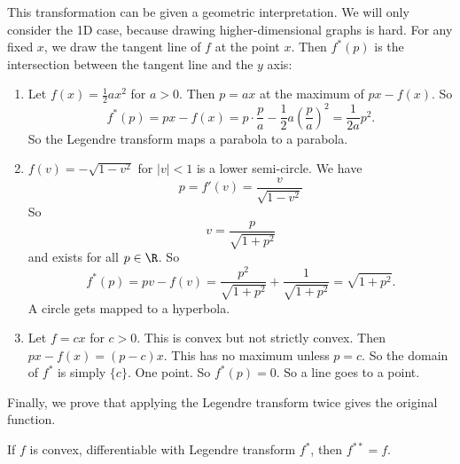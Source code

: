 \documentclass[a4paper]{article}
\begin{document}
This transformation can be given a geometric interpretation. We will only consider the 1D case, because drawing higher-dimensional graphs is hard. For any fixed $x$, we draw the tangent line of $f$ at the point $x$. Then $f^*(p)$ is the intersection between the tangent line and the $y$ axis:
\begin{center}
\end{center}

\begin{eg}\leavevmode
  \begin{enumerate}
    \item Let $f(x) = \frac{1}{2}ax^2$ for $a > 0$. Then $p = ax$ at the maximum of $px - f(x)$. So
      \[
        f^*(p) = px - f(x) = p\cdot \frac{p}{a} - \frac{1}{2}a\left(\frac{p}{a}\right)^2 = \frac{1}{2a}p^2.
      \]
      So the Legendre transform maps a parabola to a parabola.
    \item $f(v) = -\sqrt{1 - v^2}$ for $|v| < 1$ is a lower semi-circle. We have
      \[
        p = f'(v) = \frac{v}{\sqrt{1 - v^2}}
      \]
      So
      \[
        v = \frac{p}{\sqrt{1 + p^2}}
      \]
      and exists for all $p\in \R$. So
      \[
        f^*(p) = pv - f(v) = \frac{p^2}{\sqrt{1 + p^2}} + \frac{1}{\sqrt{1 + p^2}} = \sqrt{1 + p^2}.
      \]
      A circle gets mapped to a hyperbola.
    \item Let $f = cx$ for $c > 0$. This is convex but not strictly convex. Then $px - f(x) = (p - c)x$. This has no maximum unless $p = c$. So the domain of $f^*$ is simply $\{c\}$. One point. So $f^*(p) = 0$. So a line goes to a point.
  \end{enumerate}
\end{eg}

Finally, we prove that applying the Legendre transform twice gives the original function.
\begin{thm}
  If $f$ is convex, differentiable with Legendre transform $f^*$, then $f^{**} = f$.
\end{thm}
\end{document}
